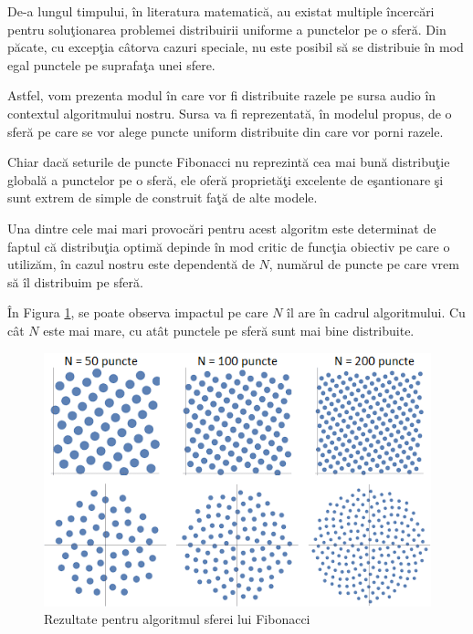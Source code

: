 	De-a lungul timpului, \^{i}n literatura matematic\u{a}, au existat multiple \^{i}ncerc\u{a}ri pentru solu\c{t}ionarea problemei distribuirii uniforme a punctelor pe o sfer\u{a}. Din p\u{a}cate, cu excep\c{t}ia c\^{a}torva cazuri speciale, nu este posibil s\u{a} se distribuie \^{i}n mod egal punctele pe suprafa\c{t}a unei sfere.
	 

	Astfel, vom prezenta modul \^{i}n care vor fi distribuite razele pe sursa audio \^{i}n contextul algoritmului nostru. Sursa va fi reprezentat\u{a}, \^{i}n modelul propus, de o sfer\u{a} pe care se vor alege puncte uniform distribuite din care vor porni razele.
	 
	
	Chiar dac\u{a} seturile de puncte Fibonacci nu reprezint\u{a} cea mai bun\u{a} distribu\c{t}ie global\u{a} a punctelor pe o sfer\u{a}, ele ofer\u{a} propriet\u{a}\c{t}i excelente de e\c{s}antionare \c{s}i sunt extrem de simple de construit fa\c{t}\u{a} de alte modele.
	 
	
	Una dintre cele mai mari provoc\u{a}ri pentru acest algoritm este determinat de faptul c\u{a} distribu\c{t}ia optim\u{a} depinde \^{i}n mod critic de func\c{t}ia obiectiv pe care o utiliz\u{a}m, \^{i}n cazul nostru este dependent\u{a} de $N$, num\u{a}rul de puncte pe care vrem s\u{a} \^{i}l distribuim pe sfer\u{a}.
	 
	
	\^{I}n Figura \ref{Fig13}, se poate observa impactul pe care $N$ \^{i}l are \^{i}n cadrul algoritmului. Cu c\^{a}t $N$ este mai mare, cu at\^{a}t punctele pe sfer\u{a} sunt mai bine distribuite.
	 
	
	\begin{figure}[!htb]
		\centering
		\includegraphics[width=0.92\linewidth]{imagini/fibo.png}
		\caption{Rezultate pentru algoritmul sferei lui Fibonacci \cite{fibo}}
		\label{Fig13}
	\end{figure}
	
